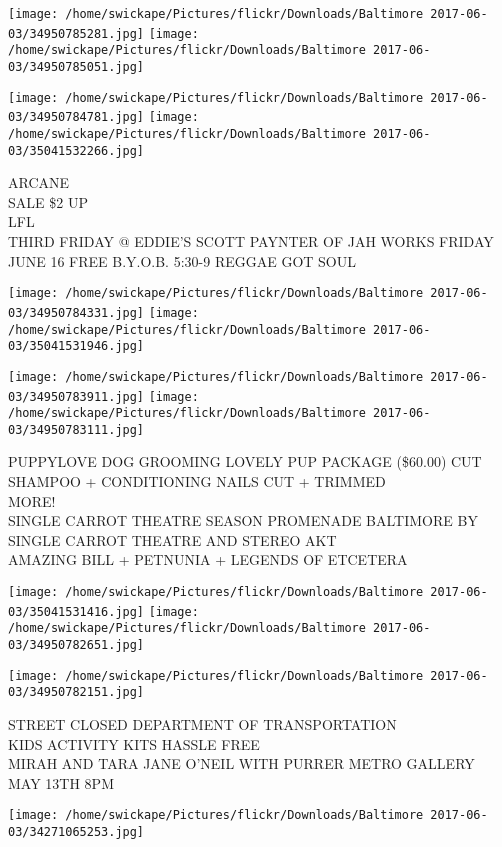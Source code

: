 \documentclass[10pt,letterpaper]{article}
\begin{document}
\texttt{[image: /home/swickape/Pictures/flickr/Downloads/Baltimore 2017-06-03/34950785281.jpg]}
\texttt{[image: /home/swickape/Pictures/flickr/Downloads/Baltimore 2017-06-03/34950785051.jpg]}

\texttt{[image: /home/swickape/Pictures/flickr/Downloads/Baltimore 2017-06-03/34950784781.jpg]}
\texttt{[image: /home/swickape/Pictures/flickr/Downloads/Baltimore 2017-06-03/35041532266.jpg]}

ARCANE\\
SALE \$2 UP\\
LFL\\
THIRD FRIDAY @ EDDIE'S SCOTT PAYNTER OF JAH WORKS FRIDAY JUNE 16 FREE B.Y.O.B. 5:30{-}9 REGGAE GOT SOUL
\pagebreak

\texttt{[image: /home/swickape/Pictures/flickr/Downloads/Baltimore 2017-06-03/34950784331.jpg]}
\texttt{[image: /home/swickape/Pictures/flickr/Downloads/Baltimore 2017-06-03/35041531946.jpg]}

\texttt{[image: /home/swickape/Pictures/flickr/Downloads/Baltimore 2017-06-03/34950783911.jpg]}
\texttt{[image: /home/swickape/Pictures/flickr/Downloads/Baltimore 2017-06-03/34950783111.jpg]}

PUPPYLOVE DOG GROOMING LOVELY PUP PACKAGE (\$60.00) CUT SHAMPOO + CONDITIONING NAILS CUT + TRIMMED\\
MORE!\\
SINGLE CARROT THEATRE SEASON PROMENADE BALTIMORE BY SINGLE CARROT THEATRE AND STEREO AKT\\
AMAZING BILL + PETNUNIA + LEGENDS OF ETCETERA
\pagebreak

\texttt{[image: /home/swickape/Pictures/flickr/Downloads/Baltimore 2017-06-03/35041531416.jpg]}
\texttt{[image: /home/swickape/Pictures/flickr/Downloads/Baltimore 2017-06-03/34950782651.jpg]}

\texttt{[image: /home/swickape/Pictures/flickr/Downloads/Baltimore 2017-06-03/34950782151.jpg]}

STREET CLOSED DEPARTMENT OF TRANSPORTATION\\
KIDS ACTIVITY KITS HASSLE FREE\\
MIRAH AND TARA JANE O'NEIL WITH PURRER METRO GALLERY MAY 13TH 8PM
\pagebreak

\texttt{[image: /home/swickape/Pictures/flickr/Downloads/Baltimore 2017-06-03/34271065253.jpg]}
\end{document}
